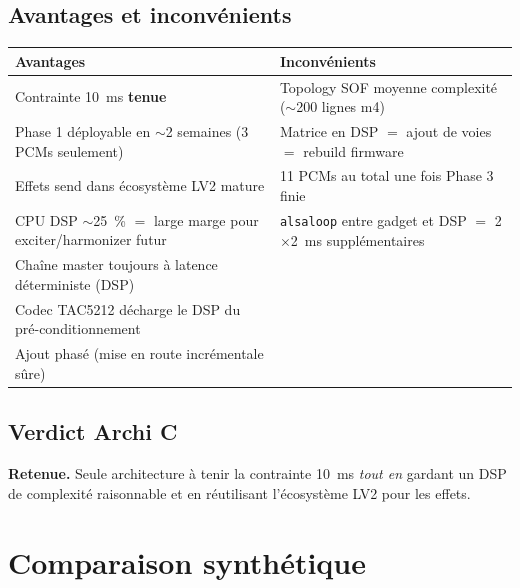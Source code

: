 \documentclass[11pt,a4paper]{article}
\begin{document}
\subsection{Avantages et inconvénients}
\begin{center}
\begin{tabularx}{\textwidth}{p{} X}
\toprule
\textbf{\textcolor{ca53}{Avantages}} & \textbf{\textcolor{chw}{Inconvénients}} \\
\midrule
Contrainte 10~ms \textbf{tenue} & Topology SOF moyenne complexité ($\sim$200 lignes m4) \\
Phase 1 déployable en $\sim$2 semaines (3 PCMs seulement) & Matrice en DSP $=$ ajout de voies $=$ rebuild firmware \\
Effets send dans écosystème LV2 mature & 11 PCMs au total une fois Phase 3 finie \\
CPU DSP $\sim$25~\% $=$ large marge pour exciter/harmonizer futur & \texttt{alsaloop} entre gadget et DSP $=$ 2$\times$2~ms supplémentaires \\
Chaîne master toujours à latence déterministe (DSP) & \\
Codec TAC5212 décharge le DSP du pré-conditionnement & \\
Ajout phasé (mise en route incrémentale sûre) & \\
\bottomrule
\end{tabularx}
\end{center}

\subsection{Verdict Archi C}
\textcolor{ca53}{\textbf{Retenue.}} Seule architecture à tenir la contrainte 10~ms \emph{tout en} gardant un DSP de complexité raisonnable et en réutilisant l'écosystème LV2 pour les effets.

\clearpage
\section{Comparaison synthétique}
\end{document}
